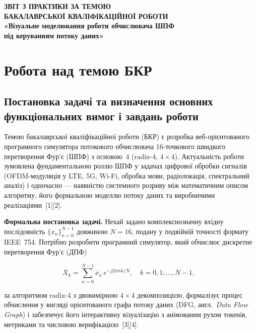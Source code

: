 \documentclass[14pt,a4paper]{extarticle}
\begin{document}
\begin{center}
  \large\bfseries
  ЗВІТ З ПРАКТИКИ ЗА ТЕМОЮ \\[2pt]
  БАКАЛАВРСЬКОЇ КВАЛІФІКАЦІЙНОЇ РОБОТИ \\[6pt]
  \normalsize\normalfont
  «Візуальне моделювання роботи обчислювача ШПФ \\
  під керуванням потоку даних»
\end{center}

\vspace{1em}

\section{Робота над темою БКР}

\subsection{Постановка задачі та визначення основних функціональних
вимог і завдань роботи}

Темою бакалаврської кваліфікаційної роботи (БКР) є розробка
веб-орієнтованого програмного симулятора потокового обчислювача
16-точкового швидкого перетворення Фур'є (ШПФ) з основою~4
($\text{radix-}4$, $4 \times 4$). Актуальність роботи зумовлена
фундаментальною роллю ШПФ у задачах цифрової обробки сигналів
(OFDM-модуляція у LTE, 5G, Wi-Fi, обробка мови, радіолокація,
спектральний аналіз) і одночасно --- наявністю системного розриву
між математичним описом алгоритму, його формальною моделлю потоку
даних та виробничими реалізаціями~[1][2].

\textbf{Формальна постановка задачі.}
Нехай задано комплекснозначну вхідну послідовність
$\{x_n\}_{n=0}^{N-1}$ довжиною $N = 16$, подану у подвійній
точності формату IEEE~754. Потрібно розробити програмний симулятор,
який обчислює дискретне перетворення Фур'є (ДПФ)

\begin{equation*}
  X_k = \sum_{n=0}^{N-1} x_n \, e^{-j 2\pi n k / N},
  \quad k = 0, 1, \ldots, N-1,
\end{equation*}

за алгоритмом radix-4 з двовимірною $4 \times 4$ декомпозицією,
формалізує процес обчислення у вигляді орієнтованого графа потоку
даних (DFG, англ.\ \textit{Data Flow Graph}) і забезпечує його
інтерактивну візуалізацію з анімованим рухом токенів, метриками та
числовою верифікацією~[3][4].
\end{document}
